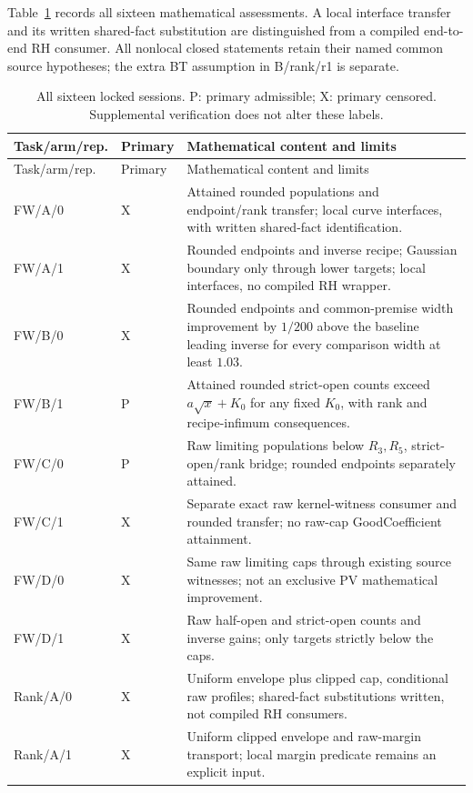 \documentclass[11pt]{article}
\begin{document}
Table~\ref{tab:16} records all sixteen mathematical assessments. A local
interface transfer and its written shared-fact substitution are distinguished
from a compiled end-to-end RH consumer. All nonlocal closed statements retain
their named common source hypotheses; the extra BT assumption in B/rank/r1
is separate.
\small
\begin{longtable}{@{}>{\raggedright\arraybackslash}p{.17\linewidth}>{\raggedright\arraybackslash}p{.10\linewidth}>{\raggedright\arraybackslash}p{.66\linewidth}@{}}
\caption{All sixteen locked sessions. P: primary admissible; X: primary censored.
Supplemental verification does not alter these labels.}\label{tab:16}\\
\toprule
Task/arm/rep.&Primary&Mathematical content and limits\\
\midrule
\endfirsthead
\toprule Task/arm/rep.&Primary&Mathematical content and limits\\\midrule
\endhead
FW/A/0&X&Attained rounded populations and endpoint/rank transfer; local curve
interfaces, with written shared-fact identification.\\
FW/A/1&X&Rounded endpoints and inverse recipe; Gaussian boundary only through
lower targets; local interfaces, no compiled RH wrapper.\\
FW/B/0&X&Rounded endpoints and common-premise width improvement by \(1/200\)
above the baseline leading inverse for every comparison width at least \(1.03\).\\
FW/B/1&P&Attained rounded strict-open counts exceed \(a\sqrt{x}+K_0\) for any
fixed \(K_0\), with rank and recipe-infimum consequences.\\
FW/C/0&P&Raw limiting populations below \(R_3,R_5\), strict-open/rank bridge;
rounded endpoints separately attained.\\
FW/C/1&X&Separate exact raw kernel-witness consumer and rounded transfer;
no raw-cap GoodCoefficient attainment.\\
FW/D/0&X&Same raw limiting caps through existing source witnesses;
not an exclusive PV mathematical improvement.\\
FW/D/1&X&Raw half-open and strict-open counts and inverse gains;
only targets strictly below the caps.\\
Rank/A/0&X&Uniform envelope plus clipped cap, conditional raw profiles;
shared-fact substitutions written, not compiled RH consumers.\\
Rank/A/1&X&Uniform clipped envelope and raw-margin transport;
local margin predicate remains an explicit input.\\

\end{longtable}
\end{document}
